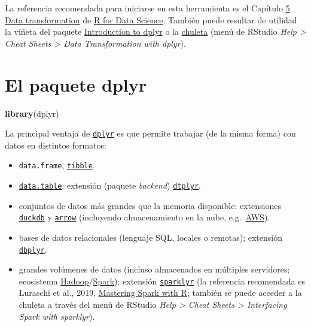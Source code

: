 \documentclass[
]{book}
\newenvironment{Shaded}{\begin{snugshade}}{\end{snugshade}}
\newcommand{\FunctionTok}[1]{\textcolor[rgb]{0.13,0.29,0.53}{\textbf{#1}}}
\newcommand{\NormalTok}[1]{#1}
\theoremstyle{break}
\theoremstyle{nonumberplain}
\begin{document}
La referencia recomendada para iniciarse en esta herramienta es el Capítulo \href{http://r4ds.had.co.nz/transform.html}{5 Data transformation} de
\href{http://r4ds.had.co.nz}{R for Data Science}.
También puede resultar de utilidad la viñeta del paquete \href{https://dplyr.tidyverse.org/articles/dplyr.html}{Introduction to dplyr} o la \href{https://posit.co/wp-content/uploads/2022/10/data-transformation-1.pdf}{chuleta} (menú de RStudio \emph{Help \textgreater{} Cheat Sheets \textgreater{} Data Transformation with dplyr}).

\section{El paquete dplyr}\label{dplyr-pkg}

\begin{Shaded}
\begin{Highlighting}[]
\FunctionTok{library}\NormalTok{(dplyr)}
\end{Highlighting}
\end{Shaded}

La principal ventaja de \href{https://dplyr.tidyverse.org/index.html}{\texttt{dplyr}} es que permite trabajar (de la misma forma) con datos en distintos formatos:

\begin{itemize}
\item
  \texttt{data.frame}, \href{https://tibble.tidyverse.org/}{\texttt{tibble}}.
\item
  \href{https://rdatatable.gitlab.io/data.table}{\texttt{data.table}}: extensión (paquete \emph{backend}) \href{https://dtplyr.tidyverse.org}{\texttt{dtplyr}}.
\item
  conjuntos de datos más grandes que la memoria disponible: extensiones \href{https://duckdb.org/docs/api/r}{\texttt{duckdb}} y \href{https://arrow.apache.org/docs/r/}{\texttt{arrow}} (incluyendo almacenamiento en la nube, e.g.~\href{https://aws.amazon.com/es/s3}{AWS}).
\item
  bases de datos relacionales (lenguaje SQL, locales o remotas); extensión \href{https://dbplyr.tidyverse.org}{\texttt{dbplyr}}.
\item
  grandes volúmenes de datos (incluso almacenados en múltiples servidores; ecosistema \href{http://hadoop.apache.org/}{Hadoop}/\href{https://spark.apache.org/}{Spark}): extensión \href{https://spark.rstudio.com}{\texttt{sparklyr}} (la referencia recomendada es Luraschi et al., 2019, \href{https://therinspark.com/}{Mastering Spark with R}; también se puede acceder a la chuleta a través del menú de RStudio \emph{Help \textgreater{} Cheat Sheets \textgreater{} Interfacing Spark with sparklyr}).
\end{itemize}
\end{document}
